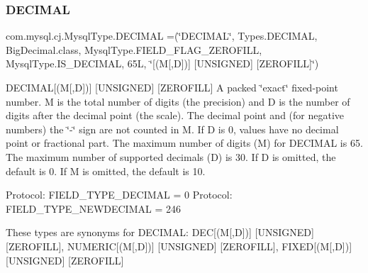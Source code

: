 \subsubsection{\texorpdfstring{D\+E\+C\+I\+M\+AL}{DECIMAL}}
{\footnotesize\ttfamily com.\+mysql.\+cj.\+Mysql\+Type.\+D\+E\+C\+I\+M\+AL =(\char`\"{}D\+E\+C\+I\+M\+AL\char`\"{}, Types.\+D\+E\+C\+I\+M\+AL, Big\+Decimal.\+class, Mysql\+Type.\+F\+I\+E\+L\+D\+\_\+\+F\+L\+A\+G\+\_\+\+Z\+E\+R\+O\+F\+I\+LL, Mysql\+Type.\+I\+S\+\_\+\+D\+E\+C\+I\+M\+AL, 65\+L, \char`\"{}\mbox{[}(\+M\mbox{[},\+D\mbox{]})\mbox{]} \mbox{[}\+U\+N\+S\+I\+G\+N\+E\+D\mbox{]} \mbox{[}\+Z\+E\+R\+O\+F\+I\+L\+L\mbox{]}\char`\"{})}

D\+E\+C\+I\+M\+AL\mbox{[}(M\mbox{[},D\mbox{]})\mbox{]} \mbox{[}U\+N\+S\+I\+G\+N\+ED\mbox{]} \mbox{[}Z\+E\+R\+O\+F\+I\+LL\mbox{]} A packed \char`\"{}exact\char`\"{} fixed-\/point number. M is the total number of digits (the precision) and D is the number of digits after the decimal point (the scale). The decimal point and (for negative numbers) the \char`\"{}-\/\char`\"{} sign are not counted in M. If D is 0, values have no decimal point or fractional part. The maximum number of digits (M) for D\+E\+C\+I\+M\+AL is 65. The maximum number of supported decimals (D) is 30. If D is omitted, the default is 0. If M is omitted, the default is 10.

Protocol\+: F\+I\+E\+L\+D\+\_\+\+T\+Y\+P\+E\+\_\+\+D\+E\+C\+I\+M\+AL = 0 Protocol\+: F\+I\+E\+L\+D\+\_\+\+T\+Y\+P\+E\+\_\+\+N\+E\+W\+D\+E\+C\+I\+M\+AL = 246

These types are synonyms for D\+E\+C\+I\+M\+AL\+: D\+EC\mbox{[}(M\mbox{[},D\mbox{]})\mbox{]} \mbox{[}U\+N\+S\+I\+G\+N\+ED\mbox{]} \mbox{[}Z\+E\+R\+O\+F\+I\+LL\mbox{]}, N\+U\+M\+E\+R\+IC\mbox{[}(M\mbox{[},D\mbox{]})\mbox{]} \mbox{[}U\+N\+S\+I\+G\+N\+ED\mbox{]} \mbox{[}Z\+E\+R\+O\+F\+I\+LL\mbox{]}, F\+I\+X\+ED\mbox{[}(M\mbox{[},D\mbox{]})\mbox{]} \mbox{[}U\+N\+S\+I\+G\+N\+ED\mbox{]} \mbox{[}Z\+E\+R\+O\+F\+I\+LL\mbox{]} \mbox{\label{enumcom_1_1mysql_1_1cj_1_1_mysql_type_acf73450623fafadf72095ff8bcab078e}} 
